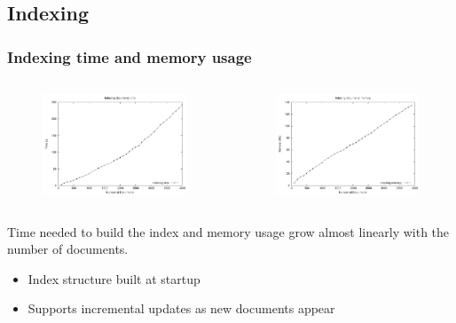 \documentclass{beamer}
\begin{document}
\subsection{Indexing}

\begin{frame}
\frametitle{Indexing time and memory usage}
\begin{columns}[T]
\centering
\begin{figure}
\includegraphics[scale=0.46]{imgs/index_time_d}
\end{figure}
\centering
\begin{figure}
\includegraphics[scale=0.46]{imgs/index_memo_d}
\end{figure}
\end{columns}
\bigskip
Time needed to build the index and memory usage grow almost linearly
with the number of documents.\\
\bigskip
\begin{itemize}
\item Index structure built at startup
\item Supports incremental updates as new documents appear
\end{itemize}
\bigskip
\end{frame}
\end{document}
